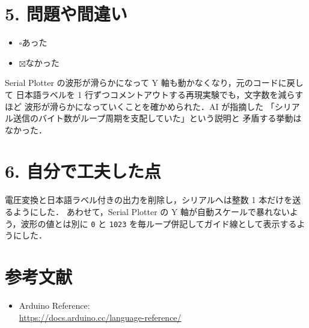 \documentclass[a4paper,11pt,dvipdfmx]{jsarticle}
\newcommand{\cboxon}{$\boxtimes$}
\newcommand{\cboxoff}{$\square$}
\begin{document}
\section*{5. 問題や間違い}
\begin{itemize}
  \item \cboxoff あった
  \item \cboxon なかった
\end{itemize}

Serial Plotter の波形が滑らかになって Y 軸も動かなくなり，元のコードに戻して
日本語ラベルを 1 行ずつコメントアウトする再現実験でも，文字数を減らすほど
波形が滑らかになっていくことを確かめられた．AI が指摘した
「シリアル送信のバイト数がループ周期を支配していた」という説明と
矛盾する挙動はなかった．

\section*{6. 自分で工夫した点}
電圧変換と日本語ラベル付きの出力を削除し，シリアルへは整数 1 本だけを送るようにした．
あわせて，Serial Plotter の Y 軸が自動スケールで暴れないよう，波形の値とは別に
\texttt{0} と \texttt{1023} を毎ループ併記してガイド線として表示するようにした．

\section*{参考文献}
\begin{itemize}
  \item Arduino Reference: \\
        \url{https://docs.arduino.cc/language-reference/}
\end{itemize}
\end{document}
